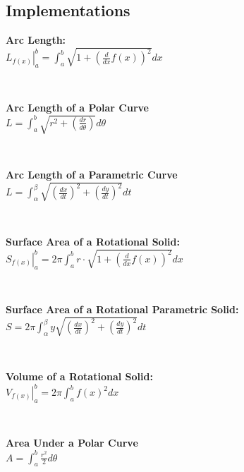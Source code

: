 \subsection*{Implementations}
\begin{minipage}{\textwidth}
    \textbf{Arc Length:}
    \\ \( \left. L_{f( x )} \right|_{a}^{b} = \displaystyle\int_{a}^{b} { \sqrt{ 1 + \left( \displaystyle\frac{ d }{ dx } f( x ) \right)^2 } dx } \)
\end{minipage}
\\ \begin{minipage}{\textwidth}
    \textbf{Arc Length of a Polar Curve}
    \\ \( L = \displaystyle\int_a^b { \displaystyle\sqrt{ r^2 + \left( \displaystyle\frac{ dr }{ d \theta } \right) } d \theta } \)
\end{minipage}
\\ \begin{minipage}{\textwidth}
    \textbf{Arc Length of a Parametric Curve}
    \\ \( L = \displaystyle\int_\alpha^\beta { \displaystyle\sqrt{ \left( \displaystyle\frac{ dx }{ dt } \right)^2 + \left( \displaystyle\frac{ dy }{ dt } \right)^2 } dt } \)
\end{minipage}
\\ \begin{minipage}{\textwidth}
    \textbf{Surface Area of a Rotational Solid:}
    \\ \( \left. S_{f( x )} \right|_{a}^{b} = 2 \pi \displaystyle\int_{a}^{b} { r \cdot \sqrt{ 1 + \left( \displaystyle\frac{ d }{ dx } f( x ) \right)^2 } dx } \)
\end{minipage}
\\ \begin{minipage}{\textwidth}
    \textbf{Surface Area of a Rotational Parametric Solid:}
    \\ \( S = 2 \pi \displaystyle\int_{\alpha}^{\beta} { y \displaystyle\sqrt{ \left( \displaystyle\frac{ dx }{ dt } \right)^2 + \left( \displaystyle\frac{ dy }{ dt } \right)^2 } dt }  \)
\end{minipage}
\\ \begin{minipage}{\textwidth}
    \textbf{Volume of a Rotational Solid:}
    \\ \( \left. V_{f( x )} \right|_{a}^{b} = 2 \pi \displaystyle\int_{a}^{b} { f( x )^2 dx } \)
\end{minipage}
\\ \begin{minipage}{\textwidth}
    \textbf{Area Under a Polar Curve}
    \\ \( A = \displaystyle\int_{a}^{b} { \displaystyle\frac{ r^2 }{ 2 } d \theta } \)
\end{minipage}
